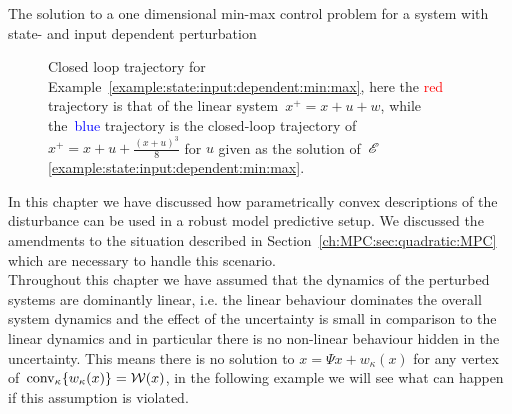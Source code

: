 \begin{example}{The solution to a one dimensional min-max control problem for a system with state- and input dependent perturbation}
\begin{figure}
\caption[Closed loop trajectories for Example~\ref{example:state:input:dependent:min:max}]{Closed loop trajectory for Example~\ref{example:state:input:dependent:min:max}, here the \textcolor{red}{red} trajectory is that of the linear system~$x^+=x+u+w$, while the~\textcolor{blue}{blue} trajectory is the closed-loop trajectory of~$x^+=x+u+\frac{(x+u)^3}{8}$ for $u$ given as the solution of~$\mathscr E$\ref{example:state:input:dependent:min:max}.}
\label{fig:example:min:max:state:dep:3}
\end{figure}
\end{example}
%
%
%
%
In this chapter we have discussed how parametrically convex descriptions of the disturbance can be used in a robust model predictive setup.
%
We discussed the amendments to the situation described in Section~\ref{ch:MPC:sec:quadratic:MPC} which are necessary to handle this scenario.
%
\\[1em]
%
Throughout this chapter we have assumed that the dynamics of the perturbed systems are dominantly linear, i.e. the linear behaviour dominates the overall system dynamics and the effect of the uncertainty is small in comparison to the linear dynamics and in particular there is no non-linear behaviour hidden in the uncertainty.
%
This means there is no solution to $x=\Psi x+w_\kappa(x)$ for any vertex of~$\text{conv}_\kappa\{w_\kappa(x)\}=\mathcal W(x)$, in the following example we will see what can happen if this assumption is violated.
